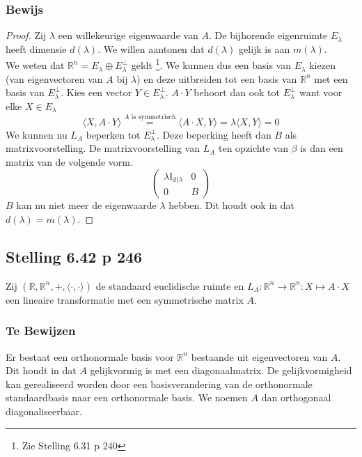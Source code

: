 \documentclass[lineaire_algebra_oplossingen.tex]{subfiles}
\begin{document}
\subsubsection*{Bewijs}
\begin{proof}
Zij $\lambda$ een willekeurige eigenwaarde van $A$. De bijhorende eigenruimte $E_\lambda$ heeft dimensie $d(\lambda)$. We willen aantonen dat $d(\lambda)$ gelijk is aan $m(\lambda)$.\\
We weten dat $\mathbb{R}^n = E_\lambda \oplus E_\lambda^\bot$ geldt \footnote{Zie Stelling 6.31 p 240}. We kunnen dus een basis van $E_\lambda$ kiezen (van eigenvectoren van $A$ bij $\lambda$) en deze uitbreiden tot een basis van $\mathbb{R}^n$ met een basis van $E_\lambda^\bot$.
Kies een vector $Y\in E_\lambda^\bot$. $A\cdot Y$ behoort dan ook tot $E_\lambda^\bot$ want voor elke $X \in E_\lambda$
\[
\langle X, A\cdot Y\rangle \overset{A \text{ is symmetrisch}}{=} \langle A\cdot X, Y \rangle = \lambda \langle X,Y \rangle = 0
\]
We kunnen nu $L_A$ beperken tot $E_\lambda^\bot$. Deze beperking heeft dan $B$ als matrixvoorstelling. De matrixvoorstelling van $L_A$ ten opzichte van $\beta$ is dan een matrix van de volgende vorm.
\[
\begin{pmatrix}
\lambda\mathbb{I}_{d(\lambda} & 0\\
0 & B
\end{pmatrix}
\]
$B$ kan nu niet meer de eigenwaarde $\lambda$ hebben. Dit houdt ook in dat $d(\lambda) = m(\lambda)$.
\end{proof}

\subsection{Stelling 6.42 p 246}
\label{6.42}
Zij $(\mathbb{R},\mathbb{R}^n,+,\langle \cdot , \cdot \rangle)$ de standaard euclidische ruimte en $L_A : \mathbb{R}^n \rightarrow \mathbb{R}^n: X \mapsto A \cdot X$ een lineaire transformatie met een symmetrische matrix $A$.

\subsubsection*{Te Bewijzen}
Er bestaat een orthonormale basis voor $\mathbb{R}^n$ bestaande uit eigenvectoren van $A$.
Dit houdt in dat $A$ gelijkvormig is met een diagonaalmatrix.
De gelijkvormigheid kan gerealiseerd worden door een basisverandering van de orthonormale standaardbasis naar een orthonormale basis.
We noemen $A$ dan orthogonaal diagonaliseerbaar.
\end{document}

